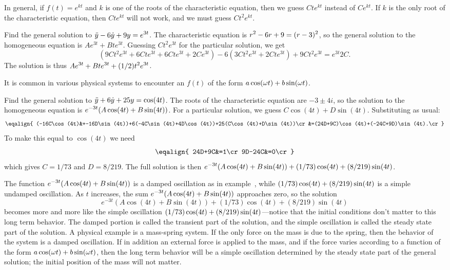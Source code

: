 In general, if $f(t)=e^{kt}$ and $k$ is one of the roots of the
characteristic equation, then we guess $Cte^{kt}$ instead of
$Ce^{kt}$. If $k$ is the only root of the characteristic equation,
then $Cte^{kt}$ will not work, and we must guess $Ct^2e^{kt}$.

\example Find the general solution to $\displaystyle\ddot y-6\dot
y+9y=e^{3t}$. The characteristic equation is 
$\displaystyle r^2-6r+9=(r-3)^2$, so the general solution to the homogeneous
equation is $Ae^{3t}+Bte^{3t}$. Guessing $Ct^2e^{3t}$ for the
particular solution, we get
$$
(9Ct^2e^{3t}+6Cte^{3t}+6Cte^{3t}+2Ce^{3t})-6(3Ct^2e^{3t}+2Cte^{3t})+9Ct^2e^{3t}
=e^{3t}2C.
$$
The solution is thus $\displaystyle Ae^{3t}+Bte^{3t}+(1/2)t^2e^{3t}$.
\endexample

It is common in various physical systems to encounter an $f(t)$ of the
form $\displaystyle a\cos(\omega t)+b\sin(\omega t)$.

\example Find the general solution to $\displaystyle\ddot y+6\dot
y+25y=\cos(4t)$. The roots of the characteristic equation are
$-3\pm 4i$, so the solution to the homogeneous equation is
$\displaystyle e^{-3t}(A\cos(4t)+B\sin(4t))$. For a particular solution, we
guess $C\cos(4t)+D\sin(4t)$. Substituting as usual:
$$\eqalign{
(-16C\cos(4t)&+-16D\sin(4t))+6(-4C\sin(4t)+4D\cos(4t))+25(C\cos(4t)+D\sin(4t))\cr
&=(24D+9C)\cos(4t)+(-24C+9D)\sin(4t).\cr}
$$
To make this equal to $\cos(4t)$ we need
$$\eqalign{
24D+9C&=1\cr
9D-24C&=0\cr}
$$
which gives $C=1/73$ and $D=8/219$. The full solution is then
$\displaystyle e^{-3t}(A\cos(4t)+B\sin(4t))+(1/73)\cos(4t)+(8/219)\sin(4t)$.

The function $\displaystyle e^{-3t}(A\cos(4t)+B\sin(4t))$ is a damped
oscillation as in example~,
while $\displaystyle(1/73)\cos(4t)+(8/219)\sin(4t)$ is a simple undamped
oscillation. As $t$ increases, the sum $\displaystyle
e^{-3t}(A\cos(4t)+B\sin(4t))$ approaches zero, so the solution
$$e^{-3t}(A\cos(4t)+B\sin(4t))+(1/73)\cos(4t)+(8/219)\sin(4t)$$
becomes more and more like the simple oscillation
$\displaystyle(1/73)\cos(4t)+(8/219)\sin(4t)$---notice that the initial
conditions don't matter to this long term behavior. The damped portion
is called the 
{\dfont transient\/} part of the
solution, and the simple oscillation is called the {\dfont
  steady state\/} 
part of the solution. 
A physical example is a mass-spring system. If the only force on the
mass is due to the spring, then the behavior of the system is a damped
oscillation. If in addition an external force is applied to the mass,
and if the force varies according to a function of the form
 $\displaystyle a\cos(\omega t)+b\sin(\omega t)$, then the long term behavior
will be a simple oscillation determined by the steady state part of the
general solution; the initial position of the mass will not matter.
\endexample

